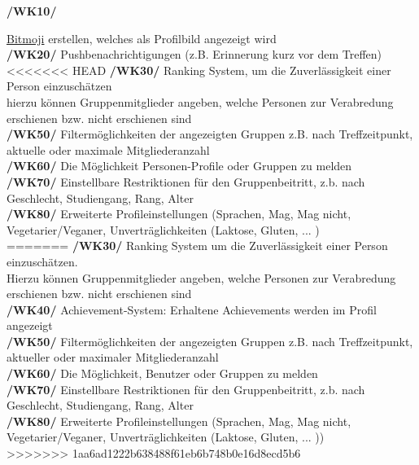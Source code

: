 \documentclass[a4paper]{scrreprt}
\begin{document}
\begin{addmargin}[25pt]{0pt} 
\hypertarget{wk10}{\textbf{/WK10/}} \hyperlink{label7}{Bitmoji} erstellen, welches als Profilbild angezeigt wird \\
\hypertarget{wk20}{\textbf{/WK20/}} Pushbenachrichtigungen (z.B. Erinnerung kurz vor dem Treffen) \\
<<<<<<< HEAD
\hypertarget{wk30}{\textbf{/WK30/}} Ranking System, um die Zuverlässigkeit einer Person einzuschätzen \\ 
	hierzu können Gruppenmitglieder angeben, welche Personen zur Verabredung erschienen bzw. nicht erschienen sind\\

\hypertarget{wk50}{\textbf{/WK50/}} Filtermöglichkeiten der angezeigten Gruppen z.B. nach Treffzeitpunkt, aktuelle oder maximale Mitgliederanzahl \\
\hypertarget{wk60}{\textbf{/WK60/}} Die Möglichkeit Personen-Profile oder Gruppen zu melden\\
\hypertarget{wk70}{\textbf{/WK70/}} Einstellbare Restriktionen für den Gruppenbeitritt, z.b. nach Geschlecht, Studiengang, Rang, Alter \\
\hypertarget{wk80}{\textbf{/WK80/}} Erweiterte Profileinstellungen (Sprachen, Mag, Mag nicht, Vegetarier/Veganer, Unverträglichkeiten (Laktose, Gluten, ... )\\
=======
\hypertarget{wk30}{\textbf{/WK30/}} Ranking System um die Zuverlässigkeit einer Person einzuschätzen.\\ 
Hierzu können Gruppenmitglieder angeben, welche Personen zur Verabredung erschienen bzw. nicht erschienen sind\\
\hypertarget{wk40}{\textbf{/WK40/}} Achievement-System: Erhaltene Achievements werden im Profil angezeigt\\
\hypertarget{wk50}{\textbf{/WK50/}} Filtermöglichkeiten der angezeigten Gruppen z.B. nach Treffzeitpunkt, aktueller oder maximaler Mitgliederanzahl \\
\hypertarget{wk60}{\textbf{/WK60/}} Die Möglichkeit, Benutzer oder Gruppen zu melden\\
\hypertarget{wk70}{\textbf{/WK70/}} Einstellbare Restriktionen für den Gruppenbeitritt, z.b. nach Geschlecht, Studiengang, Rang, Alter \\
\hypertarget{wk80}{\textbf{/WK80/}} Erweiterte Profileinstellungen (Sprachen, Mag, Mag nicht, Vegetarier/Veganer, Unverträglichkeiten (Laktose, Gluten, ... ))\\
>>>>>>> 1aa6ad1222b638488f61eb6b748b0e16d8ecd5b6

\end{addmargin}
\end{document}
